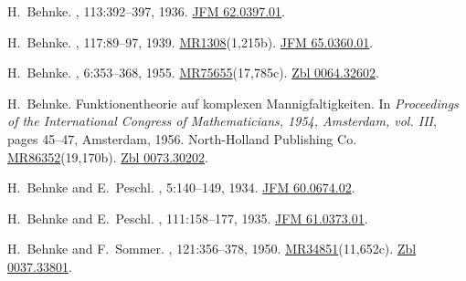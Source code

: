 \documentclass[11pt,a4paper, final, twoside]{article}
\numberwithin{equation}{section}
\begin{document}
\begin{appendices}
\begin{thebibliography}{100}
H.~Behnke.
, 113:392--397, 1936.
\newblock \href{http://zbmath.org/?q=an:62.0397.01}{JFM 62.0397.01}.

H.~Behnke.
, 117:89--97, 1939.
\newblock \href{http://www.ams.org/mathscinet-getitem?mr=1308}{MR1308}(1,215b).
  \href{http://zbmath.org/?q=an:65.0360.01}{JFM 65.0360.01}.

H.~Behnke.
, 6:353--368, 1955.
\newblock
  \href{http://www.ams.org/mathscinet-getitem?mr=75655}{MR75655}(17,785c).
  \href{http://zbmath.org/?q=an:0064.32602}{Zbl 0064.32602}.

H.~Behnke.
\newblock Funktionentheorie auf komplexen {M}annigfaltigkeiten.
\newblock In {\em Proceedings of the {I}nternational {C}ongress of
  {M}athematicians, 1954, {A}msterdam, vol. {III}}, pages 45--47, Amsterdam,
  1956. North-Holland Publishing Co.
\newblock
  \href{http://www.ams.org/mathscinet-getitem?mr=86352}{MR86352}(19,170b).
  \href{http://zbmath.org/?q=an:0073.30202}{Zbl 0073.30202}.

H.~Behnke and E.~Peschl.
, 5:140--149, 1934.
\newblock \href{http://zbmath.org/?q=an:60.0674.02}{JFM 60.0674.02}.

H.~Behnke and E.~Peschl.
, 111:158--177, 1935.
\newblock \href{http://zbmath.org/?q=an:61.0373.01}{JFM 61.0373.01}.

H.~Behnke and F.~Sommer.
, 121:356--378, 1950.
\newblock
  \href{http://www.ams.org/mathscinet-getitem?mr=34851}{MR34851}(11,652c).
  \href{http://zbmath.org/?q=an:0037.33801}{Zbl 0037.33801}.


\end{thebibliography}
\end{appendices}
\end{document}
